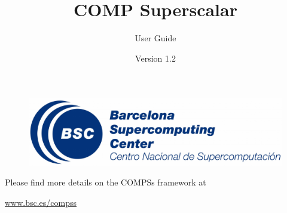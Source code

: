 \documentclass[a4paper,12pt]{article}
\title{\Huge{\bf COMP Superscalar}}
\author{\huge{User Guide}}
\date{\huge{Version 1.2}}
\begin{document}
  
  \hypersetup{pageanchor=false}
  \begin{titlepage}
    \maketitle
     \begin{figure}[b!]
      \centering
      \includegraphics[width=120mm]{./Figures/bsc_280.jpg}
     \end{figure}
    \thispagestyle{empty}
  \end{titlepage}
  \hypersetup{pageanchor=true}
  
  
  \setcounter{tocdepth}{6}
  \tableofcontents
  \listoffigures
  \listoftables
    
  \newpage

  
    
  
           
  
          
  
           
  
           
  
           
  
           
  


  \newpage

  \vspace*{\fill} 
  \begin{center}
  Please find more details on the COMPSs framework at

  \Huge{\url{www.bsc.es/compss}}
  \end{center}    
  \vspace*{\fill} 
           
\end{document}
